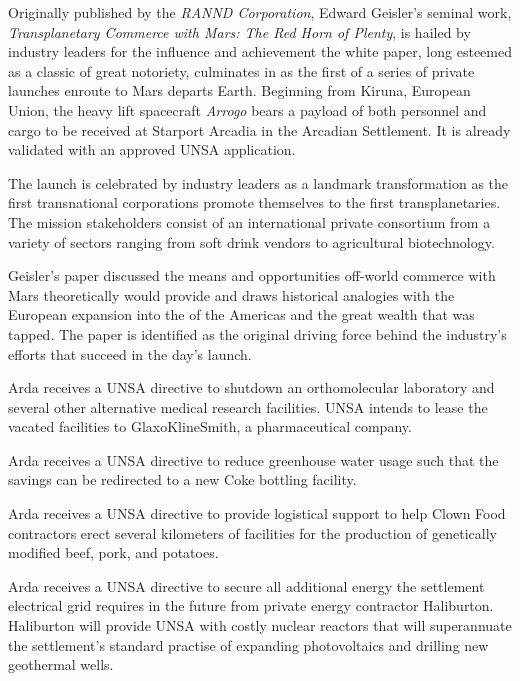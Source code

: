 Originally published by the {\it RANND Corporation}, Edward Geisler's seminal work, {\it Transplanetary Commerce with Mars: The Red Horn of Plenty}, is hailed by industry leaders for the influence and achievement the white paper, long esteemed as a classic of great notoriety, culminates in as the first of a series of private launches enroute to Mars departs Earth. Beginning from Kiruna, European Union, the heavy lift spacecraft {\it Arrogo} bears a payload of both personnel and cargo to be received at Starport Arcadia in the Arcadian Settlement. It is already validated with an approved UNSA application.

The launch is celebrated by industry leaders as a landmark transformation as the first transnational corporations promote themselves to the first transplanetaries. The mission stakeholders consist of an international private consortium from a variety of sectors ranging from soft drink vendors to agricultural biotechnology.

Geisler's paper discussed the means and opportunities off-world commerce with Mars theoretically would provide and draws historical analogies with the European expansion into the  of the Americas and the great wealth that was tapped. The paper is identified as the original driving force behind the industry's efforts that succeed in the day's launch.
\StopTimelineDate

Arda receives a UNSA directive to shutdown an orthomolecular laboratory and several other alternative medical research facilities. UNSA intends to lease the vacated facilities to GlaxoKlineSmith, a pharmaceutical company.
\StopTimelineDate

Arda receives a UNSA directive to reduce greenhouse water usage such that the savings can be redirected to a new Coke bottling facility.
\StopTimelineDate

Arda receives a UNSA directive to provide logistical support to help Clown Food contractors erect several kilometers of facilities for the production of genetically modified beef, pork, and potatoes.
\StopTimelineDate

Arda receives a UNSA directive to secure all additional energy the settlement electrical grid requires in the future from private energy contractor Haliburton. Haliburton will provide UNSA with costly nuclear reactors that will superannuate the settlement's standard practise of expanding photovoltaics and drilling new geothermal wells.
\StopTimelineDate

